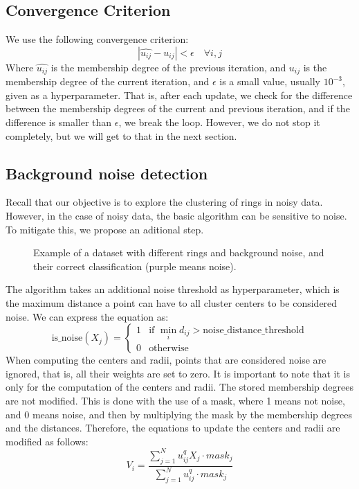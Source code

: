 \documentclass[conference]{IEEEtran}
\begin{document}
\subsection{Convergence Criterion}
We use the following convergence criterion:
\begin{equation}
|\hat{u_{ij}} - u_{ij}| < \epsilon \quad \forall i, j
\end{equation}
Where $\hat{u_{ij}}$ is the membership degree of the previous iteration, and $u_{ij}$ is the membership degree of the current iteration,
and $\epsilon$ is a small value, usually $10^{-3}$, given as a hyperparameter.
That is, after each update, we check for the difference between the membership degrees of the current and previous iteration, and if the difference is smaller than $\epsilon$,
we break the loop. However, we do not stop it completely, but we will get to that in the next section.

\subsection{Background noise detection}
Recall that our objective is to explore the clustering of rings in noisy data.
However, in the case of noisy data, the basic algorithm can be sensitive to noise. To mitigate this, we propose an aditional step.
\begin{figure}[t]
    \centering
    \resizebox{0.9\linewidth}{!}{}
    \label{fig:noisy_bg}
    \caption{Example of a dataset with different rings and background noise, and their correct classification (purple means noise).}
\end{figure}
The algorithm takes an additional noise threshold as hyperparameter, which is the maximum distance a point can have to all cluster centers to be considered noise.
We can express the equation as:
\begin{equation}
    \text{is\_noise}(X_j) = \begin{cases}
        1 & \text{if } \min_{i} d_{ij} > \text{noise\_distance\_threshold} \\
        0 & \text{otherwise}
    \end{cases}
\end{equation}
When computing the centers and radii, points that are considered noise are ignored, that is, all their weights are set to zero.
It is important to note that it is only for the computation of the centers and radii. The stored membership degrees are not modified.
This is done with the use of a mask, where 1 means not noise, and 0 means noise, and then by multiplying the mask by the membership degrees and the distances.
Therefore, the equations to update the centers and radii are modified as follows:
\begin{equation}\label{eq:V_i_new}
    V_i = \frac{\sum_{j=1}^{N} u_{ij}^q X_j \cdot mask_j}{\sum_{j=1}^{N} u_{ij}^q \cdot mask_j}
\end{equation}
\end{document}
